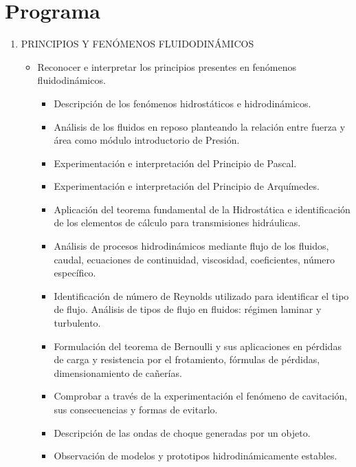 \documentclass[../main]{subfiles}
\begin{document}
\section*{Programa}
\begin{enumerate}
  \item PRINCIPIOS Y FENÓMENOS FLUIDODINÁMICOS
    \begin{itemize}
      \item Reconocer e interpretar los
        principios presentes en
        fenómenos fluidodinámicos.
        \begin{itemize}
          \item Descripción de los fenómenos hidrostáticos e
            hidrodinámicos.
          \item Análisis de los fluidos en reposo planteando la
            relación entre fuerza y área como módulo introductorio
            de Presión.
          \item Experimentación e interpretación del Principio de
            Pascal.
          \item Experimentación e interpretación del Principio de
            Arquímedes.
          \item Aplicación del teorema fundamental de la Hidrostática
            e identificación de los elementos de cálculo para
            transmisiones hidráulicas.
          \item Análisis de procesos hidrodinámicos mediante flujo de
            los fluidos, caudal, ecuaciones de continuidad,
            viscosidad, coeficientes, número específico.
          \item Identificación de número de Reynolds utilizado para
            identificar el tipo de flujo.
            Análisis de tipos de flujo en fluidos: régimen laminar y
            turbulento.
          \item Formulación del teorema de Bernoulli y sus
            aplicaciones en pérdidas de carga y resistencia por el
            frotamiento, fórmulas de pérdidas, dimensionamiento
            de cañerías.
          \item Comprobar a través de la experimentación el
            fenómeno de cavitación, sus consecuencias y formas
            de evitarlo.
          \item Descripción de las ondas de choque generadas por un
            objeto.
          \item Observación de modelos y prototipos
            hidrodinámicamente estables.
        \end{itemize}

\end{itemize}
\end{enumerate}
\end{document}
